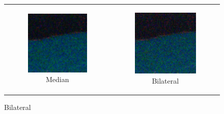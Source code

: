 \begin{figure}
\begin{tabular}{cc}
    \begin{subfigure}{0.3\textwidth}
      \includegraphics[width=\linewidth]{inc/research/simple/denoised_median.png}
      \caption{Median}
    \end{subfigure} &
    \begin{subfigure}{0.3\textwidth}
      \includegraphics[width=\linewidth]{inc/research/simple/denoised_bilateral.png}
      \caption{Bilateral}
    \end{subfigure} \\
    

\end{tabular}
\end{figure}
